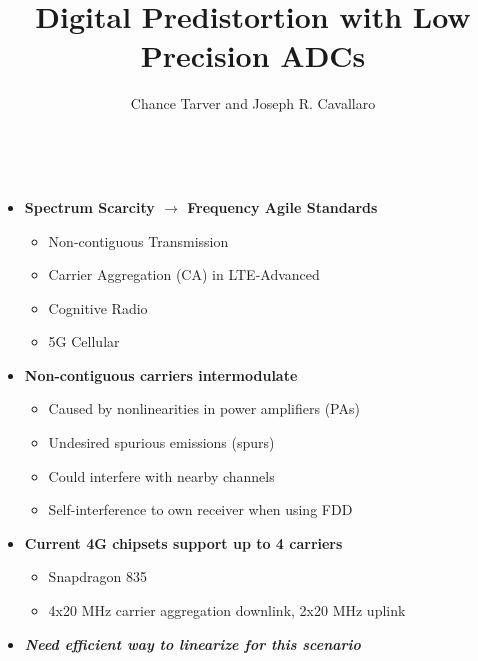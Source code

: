 \documentclass[25pt]{tikzposter} %
\title{\bf Digital Predistortion with Low Precision ADCs}
\institute{Rice University} %
\author{Chance Tarver and Joseph R. Cavallaro}
\begin{document}
\maketitle %

\begin{columns} %
\centering
{} %
{    \Large
\begin{itemize}
     \item {\bf Spectrum Scarcity $\rightarrow$ Frequency Agile Standards}
            \begin{itemize}
                \item Non-contiguous Transmission
                \item Carrier Aggregation (CA) in LTE-Advanced
                \item Cognitive Radio
                \item 5G Cellular
            \end{itemize}
        \item {\bf Non-contiguous carriers intermodulate}
        \begin{itemize}
            \item Caused by nonlinearities in power amplifiers (PAs)
            \item Undesired spurious emissions (spurs)
            \item Could interfere with nearby channels
            \item Self-interference to own receiver when using FDD
        \end{itemize}
        \item{\bf Current 4G chipsets support up to 4 carriers}
            \begin{itemize}
                \item Snapdragon 835
                \item 4x20 MHz carrier aggregation downlink, 2x20 MHz uplink
            \end{itemize}
            \vspace{1mm}
        \item{\textbf{\textit{ Need efficient way to linearize for this scenario}}}
     \end{itemize}  }
\end{columns}
\end{document}
